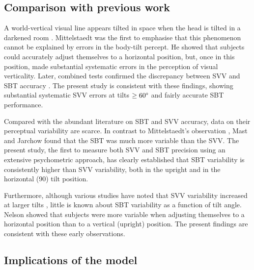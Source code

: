 \subsection{Comparison with previous work}

A world-vertical visual line appears tilted in space when the head is tilted in a darkened room \cite{aubert1861}. Mittelstaedt \citeyear{mittelstaedt1983} was the first to emphasise that this phenomenon cannot be explained by errors in the body-tilt percept. He showed that subjects could accurately adjust themselves to a horizontal position, but, once in this position, made substantial systematic errors in the perception of visual verticality. Later, combined tests confirmed the discrepancy between SVV and SBT accuracy \cite{mast1996, jarchow1999, vanbeuzekom2000, vanbeuzekom2001, kaptein2004, vingerhoets2008}. The present study is consistent with these findings, showing substantial systematic SVV errors at tilts $\ge60\degree$ and fairly accurate SBT performance.

Compared with the abundant literature on SBT and SVV accuracy, data on their perceptual variability are scarce. In contrast to Mittelstaedt's observation \citeyear{mittelstaedt1983}, Mast and Jarchow \citeyear{mast1996} found that the SBT was much more variable than the SVV. The present study, the first to measure both SVV and SBT precision using an extensive psychometric approach, has clearly established that SBT variability is consistently higher than SVV variability, both in the upright and in the horizontal (90\textdegree) tilt position.

Furthermore, although various studies have noted that SVV variability increased at larger tilts \cite{schone1964, schone1968, udodehaes1970, vanbeuzekom2001, devrijer2008}, little is known about SBT variability as a function of tilt angle. Nelson \citeyear{nelson1968} showed that subjects were more variable when adjusting themselves to a horizontal position than to a vertical (upright) position. The present findings are consistent with these early observations.


\subsection{Implications of the model}

